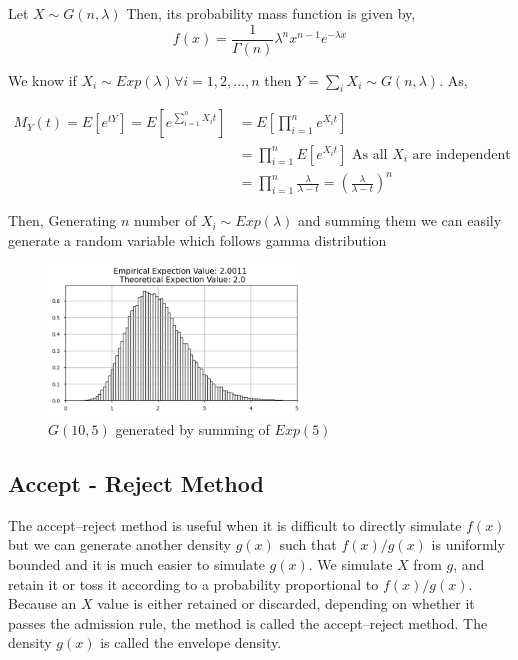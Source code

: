 \begin{example}
    Let $X\sim G(n,\lambda)$ Then, its probability  mass function is given by,
    \[
        f(x) = \frac{1}{\Gamma(n)}\lambda^{n}x^{n-1}e^{-\lambda x}
    \] 

    We know if $X_i\sim Exp(\lambda) \forall i = 1,2, \ldots ,n$ then  $Y=\sum_i X_i \sim G(n,\lambda)$. As, 

    \begin{align*}
        M_{Y}(t) = E \left[ e^{tY} \right] = E\left[ e^{\sum_{i=1}^{n} X_it  }\right] &= E\left[ \prod_{i=1}^{n} e^{X_it} \right]\\ 
                                                                                      &=\prod_{i=1}^{n} E\left[  e^{X_it} \right] \text{ As all $X_i$ are independent }\\ 
                                                                                      &= \prod_{i=1}^{n}\frac{\lambda}{\lambda-t} = \left( \frac{\lambda}{\lambda-t} \right)^{n} 
    \end{align*} 

    Then, Generating  $n$ number of $X_i\sim Exp(\lambda)$ 
    and summing them we can easily generate a random variable which follows gamma distribution
    \begin{figure}[H]
        
        \centering
        \includegraphics[width=0.6\textwidth]{images/gamma_ITA.png}
        \caption{$G(10,5)$ generated by summing of $Exp(5)$}
    \end{figure}
\end{example}

\subsection{Accept - Reject Method}
The accept–reject method is useful when it is difficult to directly simulate $f(x)$ but we can generate another density $g(x)$ such that $f(x)/g(x)$  
is uniformly bounded and it is much easier to simulate $g(x)$. We simulate  $X$ from  $g$, and retain it or toss it according 
to a probability proportional to $f(x)/g(x)$. 
Because an $X$ value is either retained
or discarded, depending on whether it passes the admission rule, the method is called
the accept–reject method. The density $g(x)$ is called the envelope density.

